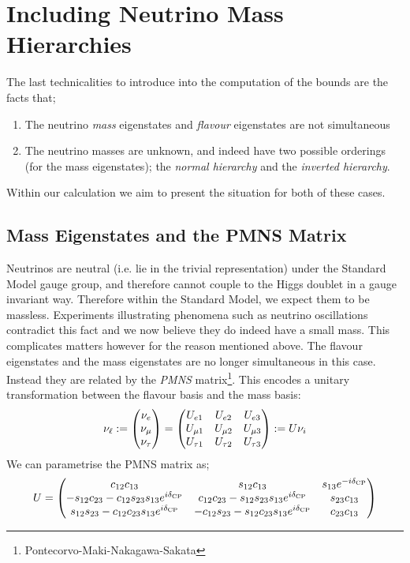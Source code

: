 \documentclass[10pt]{article}
\begin{document}
\section{Including Neutrino Mass Hierarchies}
The last technicalities to introduce into the computation of the bounds are the facts that;
\begin{enumerate}
  \item The neutrino \textit{mass} eigenstates and \textit{flavour} eigenstates are not simultaneous
  \item The neutrino masses are unknown, and indeed have two possible orderings (for the mass eigenstates); the \textit{normal hierarchy} and the \textit{inverted hierarchy}.
\end{enumerate}
Within our calculation we aim to present the situation for both of these cases.
\subsection{Mass Eigenstates and the PMNS Matrix}
Neutrinos are neutral (i.e. lie in the trivial representation) under the Standard Model gauge group, and therefore cannot couple to the Higgs doublet in a gauge invariant way. Therefore within the Standard Model, we expect them to be massless. Experiments illustrating phenomena such as neutrino oscillations contradict this fact and we now believe they do indeed have a small mass. This complicates matters however for the reason mentioned above. The flavour eigenstates and the mass eigenstates are no longer simultaneous in this case. Instead they are related by the \textit{PMNS} matrix\footnote{Pontecorvo-Maki-Nakagawa-Sakata}. This encodes a unitary transformation between the flavour basis and the mass basis:
\begin{equation}
  \mathbf{\nu}_\ell := \begin{pmatrix} \nu_e \\ \nu_\mu \\ \nu_\tau \end{pmatrix} = \begin{pmatrix}U_{e1} & U_{e2} & U_{e3} \\ U_{\mu1} & U_{\mu2} & U_{\mu3} \\ U_{\tau1} & U_{\tau2} & U_{\tau3}\end{pmatrix} := U \mathbf{\nu}_i
\end{equation}
We can parametrise the PMNS matrix as;
\begin{equation}
  U = \begin{pmatrix}c_{12}c_{13} & s_{12}c_{13} & s_{13}e^{-i\delta_{\textrm{CP}}} \\ -s_{12}c_{23} - c_{12}s_{23}s_{13}e^{i\delta_{\textrm{CP}}} & c_{12}c_{23} - s_{12}s_{23}s_{13}e^{i\delta_{\textrm{CP}}} & s_{23}c_{13} \\ s_{12}s_{23} - c_{12}c_{23}s_{13}e^{i\delta_{\textrm{CP}}} & -c_{12}s_{23} - s_{12}c_{23}s_{13}e^{i\delta_{\textrm{CP}}} & c_{23}c_{13}\end{pmatrix}
\end{equation}
\end{document}
